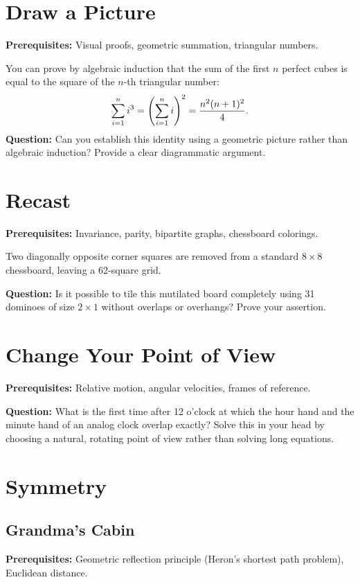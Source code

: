 \documentclass[12pt]{article}
\begin{document}
\section{Draw a Picture}
\textbf{Prerequisites:} Visual proofs, geometric summation, triangular numbers.

You can prove by algebraic induction that the sum of the first $n$ perfect cubes is equal to the square of the $n$-th triangular number:
\begin{equation}
    \sum_{i=1}^n i^3 = \left( \sum_{i=1}^n i \right)^2 = \frac{n^2(n+1)^2}{4}. \notag
\end{equation}
\textbf{Question:} Can you establish this identity using a geometric picture rather than algebraic induction? Provide a clear diagrammatic argument.

\section{Recast}
\textbf{Prerequisites:} Invariance, parity, bipartite graphs, chessboard colorings.

Two diagonally opposite corner squares are removed from a standard $8 \times 8$ chessboard, leaving a 62-square grid.

\textbf{Question:} Is it possible to tile this mutilated board completely using 31 dominoes of size $2 \times 1$ without overlaps or overhangs? Prove your assertion.

\section{Change Your Point of View}
\textbf{Prerequisites:} Relative motion, angular velocities, frames of reference.

\textbf{Question:} What is the first time after 12 o'clock at which the hour hand and the minute hand of an analog clock overlap exactly? Solve this in your head by choosing a natural, rotating point of view rather than solving long equations.

\section{Symmetry}

\subsection{Grandma's Cabin}
\textbf{Prerequisites:} Geometric reflection principle (Heron's shortest path problem), Euclidean distance.
\end{document}
